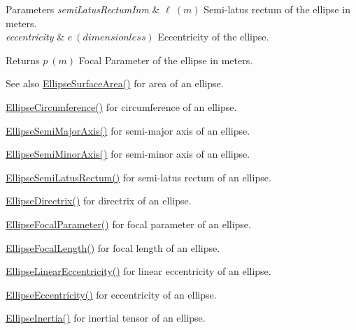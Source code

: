 \begin{DoxyParams}{Parameters}
{\em semi\+Latus\+Rectum\+Inm} & $ \ell\ (m)$ Semi-\/latus rectum of the ellipse in meters. \\
\hline
{\em eccentricity} & $ e\ (dimensionless)$ Eccentricity of the ellipse. \\
\hline
\end{DoxyParams}
\begin{DoxyReturn}{Returns}
$ p\ (m)$ Focal Parameter of the ellipse in meters. 
\end{DoxyReturn}
\begin{DoxySeeAlso}{See also}
\mbox{\hyperlink{group___e_g_x_math-_geometry-2_d-_ellipse-_surface_area_ga4ce8c8323e9718ce5458f4ab7f6d823d}{Ellipse\+Surface\+Area()}} for area of an ellipse. 

\mbox{\hyperlink{group___e_g_x_math-_geometry-2_d-_ellipse-_circumference_ga4172802ac674eb53467b44928ac635c7}{Ellipse\+Circumference()}} for circumference of an ellipse. 

\mbox{\hyperlink{group___e_g_x_math-_geometry-2_d-_ellipse-_semi_major_axis_ga646a2ca065f4ac3f666a9ea22f3bb527}{Ellipse\+Semi\+Major\+Axis()}} for semi-\/major axis of an ellipse. 

\mbox{\hyperlink{group___e_g_x_math-_geometry-2_d-_ellipse-_semi_minor_axis_gae461acf3333565d69527dd86e9aa2b32}{Ellipse\+Semi\+Minor\+Axis()}} for semi-\/minor axis of an ellipse. 

\mbox{\hyperlink{group___e_g_x_math-_geometry-2_d-_ellipse-_semi_latus_rectum_gacfd1844eb4ef3d1ee3c0b460a6442ae6}{Ellipse\+Semi\+Latus\+Rectum()}} for semi-\/latus rectum of an ellipse. 

\mbox{\hyperlink{group___e_g_x_math-_geometry-2_d-_ellipse-_directrix_gace8f72a8efbc9c18d3eb689151405106}{Ellipse\+Directrix()}} for directrix of an ellipse. 

\mbox{\hyperlink{group___e_g_x_math-_geometry-2_d-_ellipse-_focal_parameter_ga4cd01a38c72c092ef9791351948bf69b}{Ellipse\+Focal\+Parameter()}} for focal parameter of an ellipse. 

\mbox{\hyperlink{group___e_g_x_math-_geometry-2_d-_ellipse-_focal_length_gab8d63de7640c880cfecaeada6f2afdac}{Ellipse\+Focal\+Length()}} for focal length of an ellipse. 

\mbox{\hyperlink{group___e_g_x_math-_geometry-2_d-_ellipse-_linear_eccentricity_gac70b3010e30aa8b73deb50fe2b9b9a91}{Ellipse\+Linear\+Eccentricity()}} for linear eccentricity of an ellipse. 

\mbox{\hyperlink{group___e_g_x_math-_geometry-2_d-_ellipse-_eccentricity_ga6a0a7fba17f782616894cfc447628c33}{Ellipse\+Eccentricity()}} for eccentricity of an ellipse. 

\mbox{\hyperlink{group___e_g_x_math-_geometry-2_d-_ellipse-_inertia_ga10a3049c2f04b50f271fb01dc62e4cf8}{Ellipse\+Inertia()}} for inertial tensor of an ellipse. 
\end{DoxySeeAlso}
